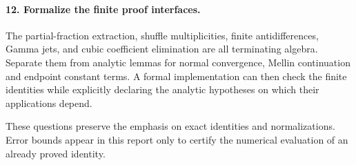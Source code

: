 \documentclass[11pt]{article}
\numberwithin{equation}{section}
\theoremstyle{definition}
\theoremstyle{remark}
\begin{document}
\paragraph{12. Formalize the finite proof interfaces.}
The partial-fraction extraction, shuffle multiplicities, finite
antidifferences, Gamma jets, and cubic coefficient elimination are
all terminating algebra. Separate them from analytic lemmas for
normal convergence, Mellin continuation and endpoint constant
terms. A formal implementation can then check the finite identities
while explicitly declaring the analytic hypotheses on which their
applications depend.

These questions preserve the emphasis on exact identities and
normalizations. Error bounds appear in this report only to certify
the numerical evaluation of an already proved identity.

\end{document}
